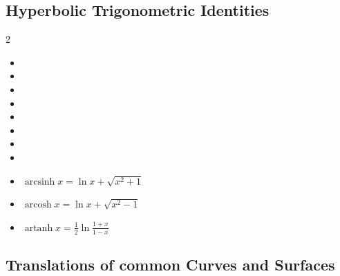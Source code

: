 \documentclass[a4paper,12pt]{article}
\begin{document}
\subsection{Hyperbolic Trigonometric Identities}
    \begin{multicols}{2}
        \begin{itemize}[leftmargin=*]
    \item {}
    \item {}
    \item {}
    \item {}
    \item {}
    \item {}
    \item {}
    \item {}
    \item \boldmath$\operatorname{arcsinh} x=\ln{x+\sqrt{x^2+1}}$
    \item \boldmath$\operatorname{arcosh} x=\ln{x+\sqrt{x^2-1}}$
    \item \boldmath$\operatorname{artanh} x=\frac{1}{2}\ln{\frac{1+x}{1-x}}$
\end{itemize}
    \end{multicols}

\subsection{Translations of common Curves and Surfaces}
\end{document}
